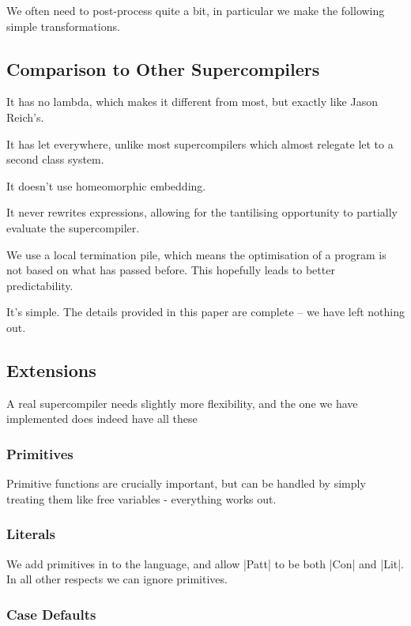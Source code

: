 \documentclass{sigplanconf}
\begin{document}
We often need to post-process quite a bit, in particular we make the following simple transformations.

\subsection{Comparison to Other Supercompilers}
\label{sec:comparison}

It has no lambda, which makes it different from most, but exactly like Jason Reich's.

It has let everywhere, unlike most supercompilers which almost relegate let to a second class system.

It doesn't use homeomorphic embedding.

It never rewrites expressions, allowing for the tantilising opportunity to partially evaluate the supercompiler.

We use a local termination pile, which means the optimisation of a program is not based on what has passed before. This hopefully leads to better predictability.

It's simple. The details provided in this paper are complete -- we have left nothing out.

\subsection{Extensions}
\label{sec:extensions}

A real supercompiler needs slightly more flexibility, and the one we have implemented does indeed have all these

\subsubsection{Primitives}

Primitive functions are crucially important, but can be handled by simply treating them like free variables - everything works out.

\subsubsection{Literals}

We add primitives in to the language, and allow |Patt| to be both |Con| and |Lit|. In all other respects we can ignore primitives.

\subsubsection{Case Defaults}
\end{document}
